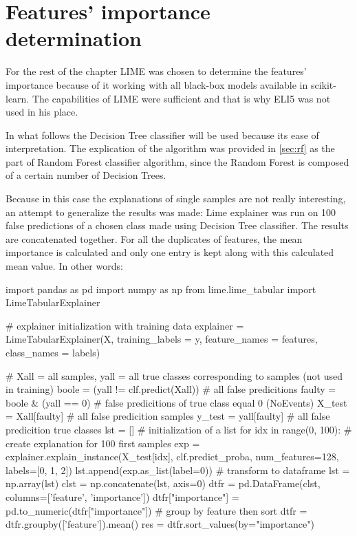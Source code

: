 \section{Features' importance determination}
For the rest of the chapter LIME was chosen to determine the features' importance because of it working with all black-box models available in scikit-learn. The capabilities of LIME were sufficient and that is why ELI5 was not used in his place.

In what follows the Decision Tree classifier will be used because its ease of interpretation. The explication of the algorithm was provided in \ref{sec:rf} as the part of Random Forest classifier algorithm, since the Random Forest is composed of a certain number of Decision Trees.

Because in this case the explanations of single samples are not really interesting, an attempt to generalize the results was made: Lime explainer was run on 100 false predictions of a chosen class made using Decision Tree classifier. The results are concatenated together. For all the duplicates of features, the mean importance is calculated and only one entry is kept along with this calculated mean value. In other words:

\begin{python}
import pandas as pd
import numpy as np
from lime.lime_tabular import LimeTabularExplainer

# explainer initialization with training data
explainer = LimeTabularExplainer(X, training_labels = y, feature_names = features, class_names = labels)

# Xall = all samples, yall = all true classes corresponding to samples (not used in training)
boole = (yall != clf.predict(Xall)) # all false predicitions
faulty = boole & (yall == 0) # false predicitions of true class equal 0 (NoEvents)
X_test = Xall[faulty] # all false predicition samples
y_test = yall[faulty] # all false predicition true classes
lst = [] # initialization of a list
for idx in range(0, 100): # create explanation for 100 first samples
    exp = explainer.explain_instance(X_test[idx], clf.predict_proba, num_features=128, labels=[0, 1, 2])
    lst.append(exp.as_list(label=0))
# transform to dataframe
lst = np.array(lst)
clst = np.concatenate(lst, axis=0)
dtfr = pd.DataFrame(clst, columns=['feature', 'importance'])
dtfr["importance"] = pd.to_numeric(dtfr["importance"])
# group by feature then sort
dtfr = dtfr.groupby(['feature']).mean()
res = dtfr.sort_values(by="importance")
\end{python}

